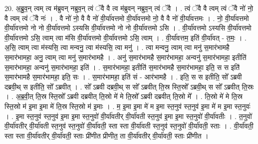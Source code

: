 \documentclass[17pt]{extarticle}
\begin{document}
20. अ॒ब्रु॒व॒न् त्वम् त्व म॑ब्रुवन् नब्रुव॒न् त्वं ॅवै वै त्व म॑ब्रुवन् नब्रुव॒न् त्वं ॅवै । . त्वं ॅवै वै त्वम् त्वं ॅवै नो॑ नो॒ वै त्वम् त्वं ॅवै नः॑ । . वै नो॑ नो॒ वै वै नो॑ वी॒र्या॑वत्तमो वी॒र्या॑वत्तमो नो॒ वै वै नो॑ वी॒र्या॑वत्तमः । . नो॒ वी॒र्या॑वत्तमो वी॒र्या॑वत्तमो नो नो वी॒र्या॑वत्तमो ऽस्यसि वी॒र्या॑वत्तमो नो नो वी॒र्या॑वत्तमो ऽसि । . वी॒र्या॑वत्तमो ऽस्यसि वी॒र्या॑वत्तमो वी॒र्या॑वत्तमो ऽसि॒ त्वाम् त्वा म॑सि वी॒र्या॑वत्तमो वी॒र्या॑वत्तमो ऽसि॒ त्वाम् । . वी॒र्या॑वत्तम॒ इति॑ वी॒र्या॑वत् - त॒मः॒ । . अ॒सि॒ त्वाम् त्वा म॑स्यसि॒ त्वा मन्वनु॒ त्वा म॑स्यसि॒ त्वा मनु॑ । . त्वा मन्वनु॒ त्वाम् त्वा मनु॑ स॒मार॑भामहै स॒मार॑भामहा॒ अनु॒ त्वाम् त्वा मनु॑ स॒मार॑भामहै । . अनु॑ स॒मार॑भामहै स॒मार॑भामहा॒ अन्वनु॑ स॒मार॑भामहा॒ इतीति॑ स॒मार॑भामहा॒ अन्वनु॑ स॒मार॑भामहा॒ इति॑ । . स॒मार॑भामहा॒ इतीति॑ स॒मार॑भामहै स॒मार॑भामहा॒ इति॒ स स इति॑ स॒मार॑भामहै स॒मार॑भामहा॒ इति॒ सः । . स॒मार॑भामहा॒ इति॑ सं - आर॑भामहै । . इति॒ स स इतीति॒ सो᳚ ऽब्रवी दब्रवी॒थ् स इतीति॒ सो᳚ ऽब्रवीत् । . सो᳚ ऽब्रवी दब्रवी॒थ् स सो᳚ ऽब्रवीत् ति॒स्र स्ति॒स्रो᳚ ऽब्रवी॒थ् स सो᳚ ऽब्रवीत् ति॒स्रः । . अ॒ब्र॒वी॒त् ति॒स्र स्ति॒स्रो᳚ ऽब्रवी दब्रवीत् ति॒स्रो मे॑ मे ति॒स्रो᳚ ऽब्रवी दब्रवीत् ति॒स्रो मे᳚ । . ति॒स्रो मे॑ मे ति॒स्र स्ति॒स्रो म॑ इ॒मा इ॒मा मे॑ ति॒स्र स्ति॒स्रो म॑ इ॒माः । . म॒ इ॒मा इ॒मा मे॑ म इ॒मा स्त॒नुव॑ स्त॒नुव॑ इ॒मा मे॑ म इ॒मा स्त॒नुवः॑ । . इ॒मा स्त॒नुव॑ स्त॒नुव॑ इ॒मा इ॒मा स्त॒नुवो॑ वी॒र्या॑वतीर् वी॒र्या॑वती स्त॒नुव॑ इ॒मा इ॒मा स्त॒नुवो॑ वी॒र्या॑वतीः । . त॒नुवो॑ वी॒र्या॑वतीर् वी॒र्या॑वती स्त॒नुव॑ स्त॒नुवो॑ वी॒र्या॑वती॒ स्ता स्ता वी॒र्या॑वती स्त॒नुव॑ स्त॒नुवो॑ वी॒र्या॑वती॒ स्ताः । . वी॒र्या॑वती॒ स्ता स्ता वी॒र्या॑वतीर् वी॒र्या॑वती॒ स्ताः प्री॑णीत प्रीणीत॒ ता वी॒र्या॑वतीर् वी॒र्या॑वती॒ स्ताः प्री॑णीत । \newline
\end{document}
